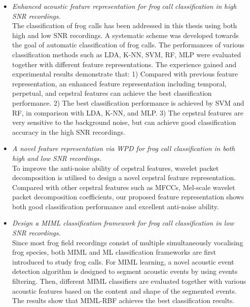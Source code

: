 \begin{itemize}
	
\item \textit{Enhanced acoustic feature representation for frog call classification in high SNR recordings.} 
\\
The classification of frog calls has been addressed in this thesis using both high and low SNR recordings. A systematic scheme was developed towards the goal of automatic classification of frog calls. The performances of various classification methods such as LDA, K-NN, SVM, RF, MLP were evaluated together with different feature representations. The experience gained and experimental results demonstrate that: 1) Compared with previous feature representation, an enhanced feature representation including temporal, perpetual, and cepstral features can achieve the best classification performance. 2) The best classification performance is achieved by SVM and RF, in comparison with LDA, K-NN, and MLP. 3) The cepstral features are very sensitive to the background noise, but can achieve good classification accuracy in the high SNR recordings. 

\item \textit{A novel feature representation via WPD for frog call classification in both high and low SNR recordings.}
\\
To improve the anti-noise ability of cepstral features, wavelet packet decomposition is utilised to design a novel cepstral feature representation. Compared with other cepstral features such as MFCCs, Mel-scale wavelet packet decomposition coefficients, our proposed feature representation shows both good classification performance and excellent anti-noise ability. 



\item  \textit{Design a MIML classification framework for frog call classification in low SNR recordings.} 
\\
Since most frog field recordings consist of multiple simultaneously vocalising frog species, both MIML and ML classification frameworks are first introduced to study frog calls. For MIML learning, a novel acoustic event detection algorithm is designed to segment acoustic events by using events filtering. Then, different MIML classifiers are evaluated together with various acoustic features based on the content and shape of the segmented events. The results show that MIML-RBF achieves the best classification results. 



\end{itemize}
